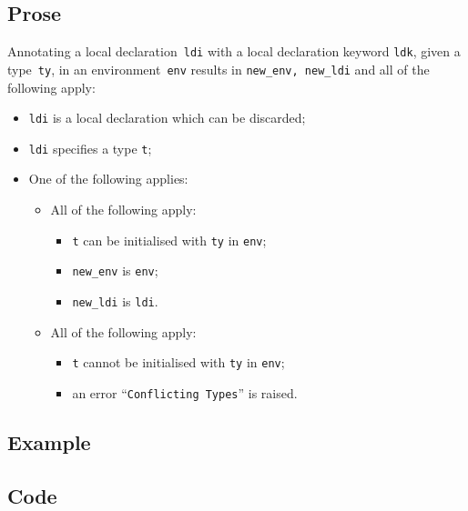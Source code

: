 \documentclass{book}
\begin{document}
  \subsection{Prose}
    Annotating a local declaration~\texttt{ldi} with a local declaration keyword \texttt{ldk}, given a type~\texttt{ty}, in
an environment~\texttt{env} results in \texttt{new\_env, new\_ldi} and all of
the following apply:
   \begin{itemize}
   \item \texttt{ldi} is a local declaration which can be discarded;
   \item \texttt{ldi} specifies a type \texttt{t};
   \item One of the following applies:
     \begin{itemize}
     \item All of the following apply:
       \begin{itemize}
       \item \texttt{t} can be initialised with \texttt{ty} in \texttt{env};
       \item \texttt{new\_env} is \texttt{env};
       \item \texttt{new\_ldi} is \texttt{ldi}.
       \end{itemize}
     \item All of the following apply:
       \begin{itemize}
       \item \texttt{t} cannot be initialised with \texttt{ty} in \texttt{env};
       \item an error ``\texttt{Conflicting Types}'' is raised.
       \end{itemize}
     \end{itemize}
   \end{itemize}

  \subsection{Example}

  \subsection{Code}
\end{document}

